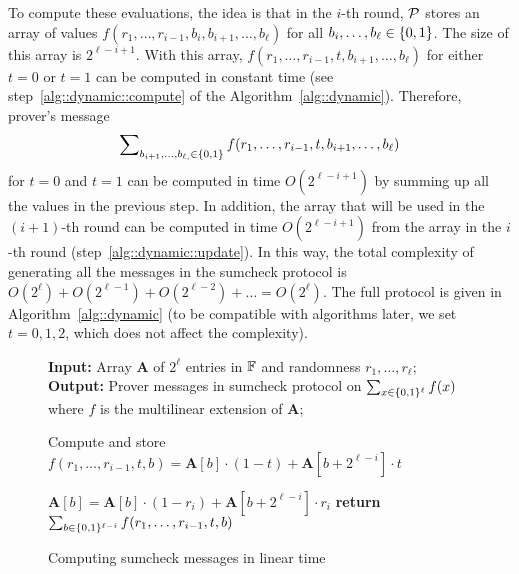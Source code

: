 To compute these evaluations, the idea is that in the $i$-th round, $\P$ stores an array of values $f(r_1,\ldots, r_{i-1}, b_{i}, b_{i+1},\ldots, b_{\ell})$ for all $b_i,\ldots,b_\ell\in\binary$. The size of this array is $2^{\ell-i+1}$. With this array, $f(r_1,\ldots, r_{i-1}, t, b_{i+1},\ldots, b_{\ell})$ for either $t=0$ or $t=1$ can be computed in constant time (see step~\ref{alg::dynamic::compute} of the Algorithm~\ref{alg::dynamic}). Therefore, prover's message
\[
\sum\nolimits_{b_{i+1},\ldots,b_{\ell, }\in\binary}f(r_1,\ldots, r_{i-1}, t, b_{i+1},\ldots, b_{\ell})
\]
for $t=0$ and $t=1$ can be computed in time $O(2^{\ell-i+1})$ by summing up all the values in the previous step. In addition, the array that will be used in the $(i+1)$-th round can be computed in time $O(2^{\ell-i+1})$ from the array in the $i$-th round (step~\ref{alg::dynamic::update}).  In this way, the total complexity of generating all the messages in the sumcheck protocol is $O(2^{\ell})+ O(2^{\ell-1}) + O(2^{\ell-2}) + \ldots = O(2^\ell)$. The full protocol is given in Algorithm~\ref{alg::dynamic} (to be compatible with algorithms later, we set $t=0,1,2$, which does not affect the complexity). 

\begin{figure}[t!]
    
	\begin{algorithm}[H]
		\caption{Computing sumcheck messages in linear time }\label{alg::dynamic}
		\hspace*{\algorithmicindent} \textbf{Input:} Array \textbf{A} of $2^\ell$ entries in $\F$ and randomness $r_1,\ldots,r_\ell$;  \\
    \hspace*{\algorithmicindent} \textbf{Output:} Prover messages in sumcheck protocol on $\sum_{x\in\binary^\ell}f(x)$ where $f$ is the multilinear extension of \textbf{A};  
		\begin{algorithmic}[1]
		
				 
					\State\label{alg::dynamic::compute} Compute and store $f(r_1,\ldots, r_{i-1}, t, b) = \textbf{A}[b]\cdot(1-t)+\textbf{A}[b+2^{\ell-i}]\cdot t$
					\EndFor
					
					\State\label{alg::dynamic::update} $\textbf{A}[b]=\textbf{A}[b]\cdot(1-r_i)+\textbf{A}[b+2^{\ell-i}]\cdot r_i$
				\EndFor
					\State\label{alg::dynamic::sum} \textbf{return} $\sum_{b\in\binary^{\ell-i}}f(r_1,\ldots, r_{i-1}, t, b)$
				\EndFor
				
			\EndFor
			
		\end{algorithmic}
	\end{algorithm}
	
\end{figure}

